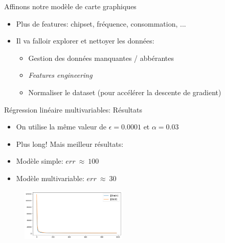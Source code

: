 \documentclass[11pt]{beamer}
\begin{document}
\begin{frame}{Affinons notre modèle de carte graphiques}
  \begin{itemize}
  \item Plus de features: chipset, fréquence, consommation, ...
  \item Il va falloir explorer et nettoyer les données:
    \begin{itemize}
      \normalsize
    \item Gestion des données manquantes / abbérantes
    \item \textit{Features engineering}
    \item Normaliser le dataset (pour accélérer la descente de gradient)
    \end{itemize}
  \end{itemize}
\end{frame}

\begin{frame}{Régression linéaire multivariables: Résultats}
  \begin{itemize}
  \item On utilise la même valeur de $\epsilon = 0.0001$ et $\alpha = 0.03$
  \item Plus long! Mais meilleur résultats:
  \item Modèle simple: $err ~ \approx ~ 100$
  \item Modèle multivariable: $err ~ \approx ~ 30$
  \end{itemize}
  \begin{figure}
    \includegraphics[width=0.45\textwidth]{figs/multiVarDesc.png}\\
  \end{figure}
\end{frame}
  
\end{document}
